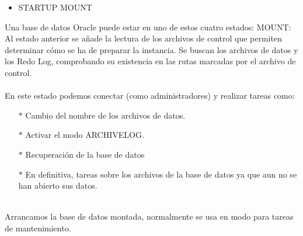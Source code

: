 \begin{itemize}
	\item STARTUP MOUNT 
\end{itemize}
\begin{adjustwidth}{0.40in}{0.0in}
	Una base de datos Oracle puede estar en uno de estos cuatro estados:
	MOUNT: Al estado anterior se añade la lectura de los archivos de control que permiten determinar cómo se ha de preparar la instancia. Se buscan los archivos de datos y los Redo Log, comprobando su existencia en las rutas marcadas por el archivo de control.\\ \\
	En este estado podemos conectar (como administradores) y realizar tareas como:
	\begin{itemize}
		\item[$*$] Cambio del nombre de los archivos de datos.
		\item[$*$] Activar el modo ARCHIVELOG.
		\item[$*$] Recuperación de la base de datos
		\item[$*$] En definitiva, tareas sobre los archivos de la base de datos ya que aun no se han abierto sus datos.	\\
\\
	\end{itemize}
	Arrancamos la base de datos montada, normalmente se usa en modo para tareas de mantenimiento.	
\end{adjustwidth}

